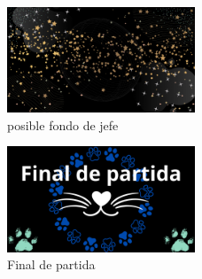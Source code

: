 \begin{figure}[H]
    \centering
   \includegraphics[width=0.5\textwidth]{recursos/Imagenes/Jefe.png} 
    \caption{posible fondo de jefe}
    \label{fig:mi_imagen}
\end{figure}
\begin{figure}[H]
    \centering
   \includegraphics[width=0.5\textwidth]{recursos/Imagenes/Final partida.png} 
    \caption{Final de partida}
    \label{fig:mi_imagen}
\end{figure}
